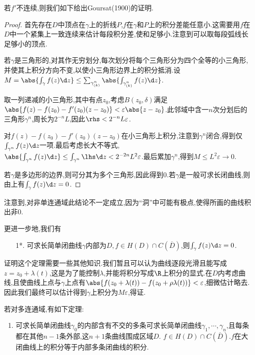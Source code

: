 \documentclass{article}
\begin{document}
若$f'$不连续,则我们如下给出Goursat(1900)的证明.
\begin{proof}
    首先存在$D$中顶点在$\gamma$上的折线$P$,$f$在$\gamma$和$P$上的积分差能任意小.这需要用$f$在$D$中一个紧集上一致连续来估计每段积分差,使和足够小.注意到可以取每段弧线长足够小的顶点.

    若$\gamma$是三角形的,对其作无穷划分,每次划分将每个三角形分为四个全等的小三角形,并使其上积分方向不变,以使小三角形边界上的积分抵消.设$M=\abs{\int_\gamma f(z)\d z}\leq \sum_{\gamma^n_{(k)}}\abs{\int_{\gamma^n_{(k)}}f(z)\d z}$.

    取一列递减的小三角形,其中有点$z_0$,考虑$B(z_0,\delta)$满足$\abs{f(z)-f(z_0)-f'(z_0)(z-z_0)}<\varepsilon\abs{z-z_0}$.此邻域中含一$n$次分划后的三角形$\gamma^n$,周长为$2^{-n}L$,因此$\rhs<2^{-n}L\varepsilon$.

    对$f(z)-f(z_0)-f'(z_0)(z-z_0)$在小三角形上积分,注意到$\gamma^n$闭合,得到仅$\int_{\gamma^n}f(z)\d z$一项.最后考虑长大不等式,$\abs{\int_{\gamma^n}f(z)\d z}\leq \int_{\gamma^n}\lhs\d z<2^{-2n}L^2\varepsilon$.最后累加$\gamma^n$,得到$M\leq L^2\varepsilon\to 0$.

    若$\gamma$是多边形的边界,则可分其为多个三角形,因此得到0.若$\gamma$是一般可求长闭曲线,则由上有$\int_\gamma f(z)\d z=0$.
\end{proof}
注意到,对非单连通域此结论不一定成立,因为``洞''中可能有极点,使得所画的曲线积出非0.

更进一步地,我们有\begin{enumerate}
    \item[1*.] 可求长简单闭曲线$\gamma$内部为$D, f\in H(D)\cap C(\overline{D})$,则$\int_\gamma f(z)\d z=0$.
\end{enumerate}

证明这个定理需要一些其他知识.我们暂且可以认为曲线逐段光滑且能写成$z=z_0+\lambda(t)$,这是为了能控制$\lambda$,并能将积分写成$\R$上积分的显式.在$D$内考虑曲线,且使曲线上点与$\gamma$上点有$\abs{f(z_0+\lambda(t))-f(z_0+\rho\lambda(t))}<\varepsilon$,细微估计略去.因此我们最终可以估计得到$\gamma$上积分为$M\varepsilon$,得证.

若对多连通域,有如下定理:
\begin{enumerate}[start=2]
    \item 可求长简单闭曲线$\gamma_0$的内部含有不交的多条可求长简单闭曲线$\gamma_1,\cdots,\gamma_n$,且每条都在其他$n-1$条外部,这$n+1$条曲线围成区域$D$. $f\in H(D)\cap C(\overline{D})$.$f$在大闭曲线上的积分等于内部多条闭曲线的积分.
\end{enumerate}
\end{document}

